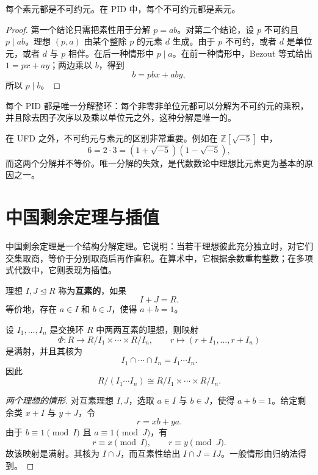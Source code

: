 \begin{proposition}
每个素元都是不可约元。在 PID 中，每个不可约元都是素元。
\end{proposition}

\begin{proof}
第一个结论只需把素性用于分解 $p=ab$。对第二个结论，设 $p$ 不可约且 $p\mid ab$。理想 $(p,a)$ 由某个整除 $p$ 的元素 $d$ 生成。由于 $p$ 不可约，或者 $d$ 是单位元，或者 $d$ 与 $p$ 相伴。在后一种情形中 $p\mid a$。在前一种情形中，Bezout 等式给出 $1=px+ay$；两边乘以 $b$，得到
\[
    b=pbx+aby,
\]
所以 $p\mid b$。
\end{proof}

\begin{theorem}
每个 PID 都是唯一分解整环：每个非零非单位元都可以分解为不可约元的乘积，并且除去因子次序以及乘以单位元之外，这种分解是唯一的。
\end{theorem}

\begin{remark}
在 UFD 之外，不可约元与素元的区别非常重要。例如在 $\mathbb{Z}[\sqrt{-5}]$ 中，
\[
    6=2\cdot3=(1+\sqrt{-5})(1-\sqrt{-5}),
\]
而这两个分解并不等价。唯一分解的失效，是代数数论中理想比元素更为基本的原因之一。
\end{remark}

\section{中国剩余定理与插值}

中国剩余定理是一个结构分解定理。它说明：当若干理想彼此充分独立时，对它们交集取商，等价于分别取商后再作直积。在算术中，它根据余数重构整数；在多项式代数中，它则表现为插值。

\begin{definition}[互素理想]
理想 $I,J\trianglelefteq R$ 称为\textbf{互素的}，如果
\[
    I+J=R.
\]
等价地，存在 $a\in I$ 和 $b\in J$，使得 $a+b=1$。
\end{definition}

\begin{theorem}[中国剩余定理]
设 $I_1,\dots,I_n$ 是交换环 $R$ 中两两互素的理想，则映射
\[
    \Phi:R\to R/I_1\times\cdots\times R/I_n,
    \qquad
    r\mapsto(r+I_1,\dots,r+I_n)
\]
是满射，并且其核为
\[
    I_1\cap\cdots\cap I_n=I_1\cdots I_n.
\]
因此
\[
    R/(I_1\cdots I_n)
    \cong
    R/I_1\times\cdots\times R/I_n.
\]
\end{theorem}

\begin{proof}[两个理想的情形]
对互素理想 $I,J$，选取 $a\in I$ 与 $b\in J$，使得 $a+b=1$。给定剩余类 $x+I$ 与 $y+J$，令
\[
    r=xb+ya.
\]
由于 $b\equiv1\pmod I$ 且 $a\equiv1\pmod J$，有
\[
    r\equiv x\pmod I,
    \qquad
    r\equiv y\pmod J.
\]
故该映射是满射。其核为 $I\cap J$，而互素性给出 $I\cap J=IJ$。一般情形由归纳法得到。
\end{proof}

